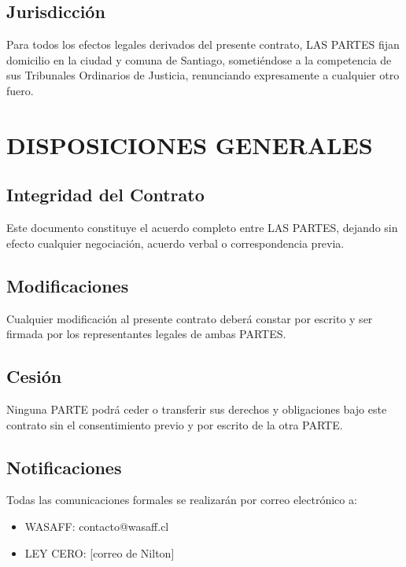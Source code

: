 \documentclass[11pt,letterpaper]{article}
\begin{document}
\subsection{Jurisdicción}

Para todos los efectos legales derivados del presente contrato, LAS PARTES fijan domicilio en la ciudad y comuna de Santiago, sometiéndose a la competencia de sus Tribunales Ordinarios de Justicia, renunciando expresamente a cualquier otro fuero.


\section{DISPOSICIONES GENERALES}

\subsection{Integridad del Contrato}

Este documento constituye el acuerdo completo entre LAS PARTES, dejando sin efecto cualquier negociación, acuerdo verbal o correspondencia previa.

\subsection{Modificaciones}

Cualquier modificación al presente contrato deberá constar por escrito y ser firmada por los representantes legales de ambas PARTES.

\subsection{Cesión}

Ninguna PARTE podrá ceder o transferir sus derechos y obligaciones bajo este contrato sin el consentimiento previo y por escrito de la otra PARTE.

\subsection{Notificaciones}

Todas las comunicaciones formales se realizarán por correo electrónico a:

\begin{itemize}
    \item WASAFF: contacto@wasaff.cl
    \item LEY CERO: [correo de Nilton]
\end{itemize}
\end{document}

